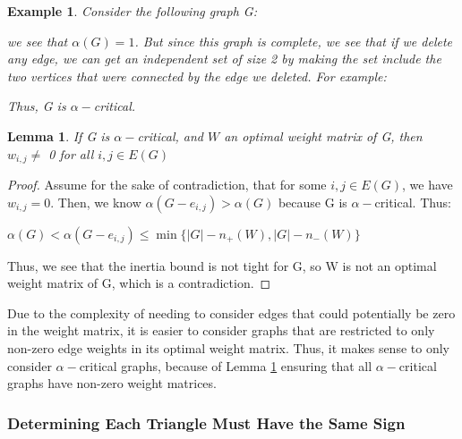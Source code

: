 \documentclass[12pt]{article}
\theoremstyle{parenbold}
\newtheorem{exmp}{Example}[section]
\newtheorem{lemma}{Lemma}[section]
\begin{document}
\begin{exmp}
Consider the following graph G:


we see that $\alpha(G) = 1$. But since this graph is complete, we see that if we delete any edge, we can get an independent set of size 2 by making the set include the two vertices that were connected by the edge we deleted. For example:


Thus, G is $\alpha-$critical.
\end{exmp}

\begin{lemma}
\label{alpha}
If G is $\alpha-$critical, and $W$ an optimal weight matrix of G, then $w_{i,j} \neq$ 0 for all $i,j \in E(G)$
\end{lemma} 
\begin{proof}
Assume for the sake of contradiction, that for some $i,j \in E(G)$, we have $w_{i,j} = 0$. Then, we know $\alpha(G-e_{i,j}) > \alpha(G)$ because G is $\alpha-$critical. Thus:

$\alpha(G) < \alpha(G-e_{i,j}) \leq \min\{|G| - n_+(W),|G| - n_-(W)\}$

Thus, we see that the inertia bound is not tight for G, so W is not an optimal weight matrix of G, which is a contradiction.
\end{proof}

Due to the complexity of needing to consider edges that could potentially be zero in the weight matrix, it is easier to consider graphs that are restricted to only non-zero edge weights in its optimal weight matrix. Thus, it makes sense to only consider $\alpha-$critical graphs, because of Lemma \ref{alpha} ensuring that all $\alpha-$critical graphs have non-zero weight matrices.

\subsubsection{Determining Each Triangle Must Have the Same Sign}






\end{document}
